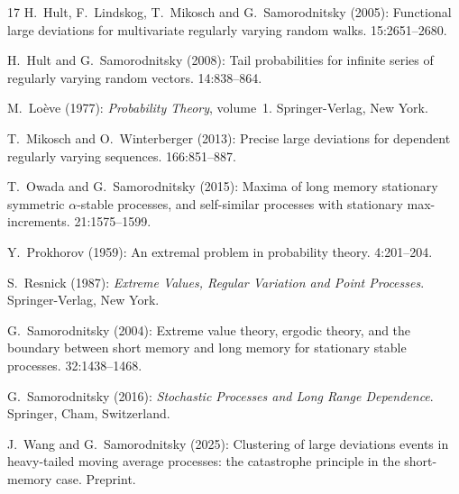 \documentclass[11pt,reqno]{amsart}
\numberwithin{equation}{section}
\theoremstyle{definition}
\theoremstyle{remark}
\theoremstyle{definition}
\begin{document}
\begin{thebibliography}{17}
{\sc H.~Hult, F.~Lindskog, T.~Mikosch {\rm and} G.~Samorodnitsky} (2005):
  Functional large deviations for multivariate regularly varying random walks.
 15:2651--2680.

{\sc H.~Hult {\rm and} G.~Samorodnitsky} (2008): Tail probabilities for
  infinite series of regularly varying random vectors.
 14:838--864.

{\sc M.~Lo{\`e}ve} (1977): {\em Probability Theory\/}, volume~1.
\newblock Springer-Verlag, New York.

{\sc T.~Mikosch {\rm and} O.~Winterberger} (2013): Precise large deviations for
  dependent regularly varying sequences.
 166:851--887.

{\sc T.~Owada {\rm and} G.~Samorodnitsky} (2015): Maxima of long memory
  stationary symmetric $\alpha$-stable processes, and self-similar processes
  with stationary max-increments.
 21:1575–1599.

{\sc Y.~Prokhorov} (1959): An extremal problem in probability theory.
 4:201--204.

{\sc S.~Resnick} (1987): {\em Extreme Values, Regular Variation and Point
  Processes\/}.
\newblock Springer-Verlag, New York.

{\sc G.~Samorodnitsky} (2004): Extreme value theory, ergodic theory, and the
  boundary between short memory and long memory for stationary stable
  processes.
 32:1438--1468.

{\sc G.~Samorodnitsky} (2016): {\em Stochastic Processes and Long Range
  Dependence\/}.
\newblock Springer, Cham, Switzerland.

{\sc J.~Wang {\rm and} G.~Samorodnitsky} (2025): Clustering of large deviations
  events in heavy-tailed moving average processes: the catastrophe principle in
  the short-memory case.
\newblock Preprint.

\end{thebibliography}
\end{document}
